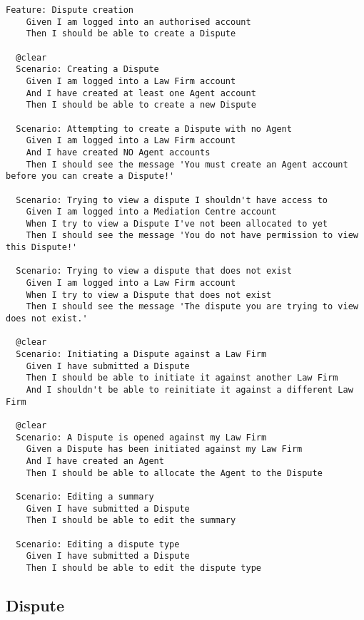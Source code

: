 \begin{lstlisting}
Feature: Dispute creation
    Given I am logged into an authorised account
    Then I should be able to create a Dispute

  @clear
  Scenario: Creating a Dispute
    Given I am logged into a Law Firm account
    And I have created at least one Agent account
    Then I should be able to create a new Dispute

  Scenario: Attempting to create a Dispute with no Agent
    Given I am logged into a Law Firm account
    And I have created NO Agent accounts
    Then I should see the message 'You must create an Agent account before you can create a Dispute!'

  Scenario: Trying to view a dispute I shouldn't have access to
    Given I am logged into a Mediation Centre account
    When I try to view a Dispute I've not been allocated to yet
    Then I should see the message 'You do not have permission to view this Dispute!'

  Scenario: Trying to view a dispute that does not exist
    Given I am logged into a Law Firm account
    When I try to view a Dispute that does not exist
    Then I should see the message 'The dispute you are trying to view does not exist.'

  @clear
  Scenario: Initiating a Dispute against a Law Firm
    Given I have submitted a Dispute
    Then I should be able to initiate it against another Law Firm
    And I shouldn't be able to reinitiate it against a different Law Firm

  @clear
  Scenario: A Dispute is opened against my Law Firm
    Given a Dispute has been initiated against my Law Firm
    And I have created an Agent
    Then I should be able to allocate the Agent to the Dispute

  Scenario: Editing a summary
    Given I have submitted a Dispute
    Then I should be able to edit the summary

  Scenario: Editing a dispute type
    Given I have submitted a Dispute
    Then I should be able to edit the dispute type
\end{lstlisting}

\subsection{Dispute}

